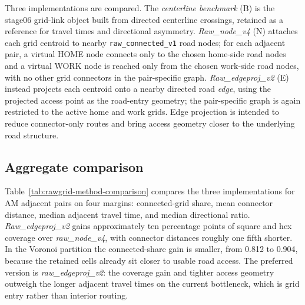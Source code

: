 \documentclass[12pt]{article}
\begin{document}
	Three implementations are compared. The \emph{centerline benchmark} (B) is the stage06 grid-link object built from directed centerline crossings, retained as a reference for travel times and directional asymmetry. \emph{Raw\_node\_v4} (N) attaches each grid centroid to nearby \texttt{raw\_connected\_v1} road nodes; for each adjacent pair, a virtual HOME node connects only to the chosen home-side road nodes and a virtual WORK node is reached only from the chosen work-side road nodes, with no other grid connectors in the pair-specific graph. \emph{Raw\_edgeproj\_v2} (E) instead projects each centroid onto a nearby directed road \emph{edge}, using the projected access point as the road-entry geometry; the pair-specific graph is again restricted to the active home and work grids. Edge projection is intended to reduce connector-only routes and bring access geometry closer to the underlying road structure.

	\subsection{Aggregate comparison}

Table~\ref{tab:rawgrid-method-comparison} compares the three implementations for AM adjacent pairs on four margins: connected-grid share, mean connector distance, median adjacent travel time, and median directional ratio. \emph{Raw\_edgeproj\_v2} gains approximately ten percentage points of square and hex coverage over \emph{raw\_node\_v4}, with connector distances roughly one fifth shorter. In the Voronoi partition the connected-share gain is smaller, from 0.812 to 0.904, because the retained cells already sit closer to usable road access. The preferred version is \emph{raw\_edgeproj\_v2}: the coverage gain and tighter access geometry outweigh the longer adjacent travel times on the current bottleneck, which is grid entry rather than interior routing.
\end{document}
